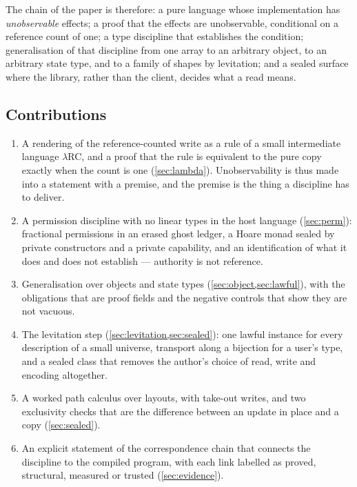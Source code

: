 \documentclass[11pt,a4paper]{article}
\theoremstyle{definition}
\theoremstyle{plain}
\newcommand{\lrc}{\textup{$\lambda$RC}}
\begin{document}
The chain of the paper is therefore: a pure language whose implementation has
\emph{unobservable} effects; a proof that the effects are unobservable,
conditional on a reference count of one; a type discipline that establishes the
condition; generalisation of that discipline from one array to an arbitrary
object, to an arbitrary state type, and to a family of shapes by levitation; and
a sealed surface where the library, rather than the client, decides what a read
means.

\subsection{Contributions}

\begin{enumerate}[leftmargin=1.4em,itemsep=2pt]
\item A rendering of the reference-counted write as a rule of a small
intermediate language \lrc, and a proof that the rule is equivalent to the pure
copy exactly when the count is one (\cref{sec:lambda}). Unobservability is thus
made into a statement with a premise, and the premise is the thing a discipline
has to deliver.
\item A permission discipline with no linear types in the host language
(\cref{sec:perm}): fractional permissions in an erased ghost ledger, a Hoare
monad sealed by private constructors and a private capability, and an
identification of what it does and does not establish --- authority is not
reference.
\item Generalisation over objects and state types (\cref{sec:object,sec:lawful}),
with the obligations that are proof fields and the negative controls that show
they are not vacuous.
\item The levitation step (\cref{sec:levitation,sec:sealed}): one lawful instance
for every description of a small universe, transport along a bijection for a
user's type, and a sealed class that removes the author's choice of read,
write and encoding altogether.
\item A worked path calculus over layouts, with take-out writes, and two
exclusivity checks that are the difference between an update in place and a
copy (\cref{sec:sealed}).
\item An explicit statement of the correspondence chain that connects the
discipline to the compiled program, with each link labelled as proved,
structural, measured or trusted (\cref{sec:evidence}).
\end{enumerate}
\end{document}
